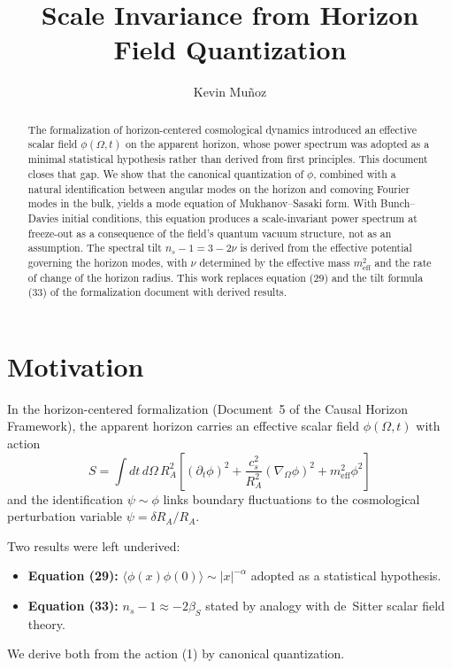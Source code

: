 \documentclass[12pt,a4paper]{article}
\title{Scale Invariance from Horizon Field Quantization}
\author{Kevin Mu\~noz}
\date{}
\begin{document}
\maketitle

\begin{abstract}
The formalization of horizon-centered cosmological dynamics introduced an effective scalar field $\phi(\Omega, t)$ on the apparent horizon, whose power spectrum was adopted as a minimal statistical hypothesis rather than derived from first principles. This document closes that gap. We show that the canonical quantization of $\phi$, combined with a natural identification between angular modes on the horizon and comoving Fourier modes in the bulk, yields a mode equation of Mukhanov--Sasaki form. With Bunch--Davies initial conditions, this equation produces a scale-invariant power spectrum at freeze-out as a consequence of the field's quantum vacuum structure, not as an assumption. The spectral tilt $n_s - 1 = 3 - 2\nu$ is derived from the effective potential governing the horizon modes, with $\nu$ determined by the effective mass $m_\text{eff}^2$ and the rate of change of the horizon radius. This work replaces equation (29) and the tilt formula (33) of the formalization document with derived results.
\end{abstract}

\section{Motivation}

In the horizon-centered formalization (Document~5 of the Causal Horizon Framework), the apparent horizon carries an effective scalar field $\phi(\Omega, t)$ with action
\begin{equation}
S = \int dt\, d\Omega\, R_A^2 \left[(\partial_t \phi)^2 + \frac{c_s^2}{R_A^2}(\nabla_\Omega \phi)^2 + m_\text{eff}^2 \phi^2\right] \tag{1}
\end{equation}
and the identification $\psi \sim \phi$ links boundary fluctuations to the cosmological perturbation variable $\psi = \delta R_A / R_A$.

Two results were left underived:
\begin{itemize}
  \item \textbf{Equation (29):} $\langle \phi(x)\phi(0) \rangle \sim |x|^{-\alpha}$ adopted as a statistical hypothesis.
  \item \textbf{Equation (33):} $n_s - 1 \approx -2\beta_S$ stated by analogy with de~Sitter scalar field theory.
\end{itemize}
We derive both from the action (1) by canonical quantization.
\end{document}
